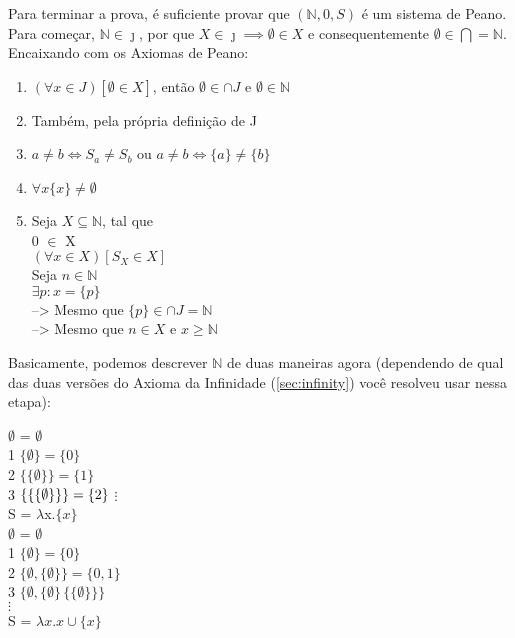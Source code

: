 \documentclass[12pt, a4paper]{article}
\begin{document}
Para terminar a prova, é suficiente provar que $(\mathbb{N}, 0, S)$ é um sistema de Peano. Para começar, $\mathbb{N} \in \jmath$, por que $X \in \jmath \implies \emptyset \in X$ e consequentemente $\emptyset \in \bigcap = \mathbb{N}$.
Encaixando com os Axiomas de Peano:
\begin{enumerate}
\item $(\forall x \in J)[\emptyset \in X]$, então $\emptyset \in \cap J$ e $\emptyset \in \mathbb{N}$
\item Também, pela própria definição de J
\item $a \neq b \iff S_a \neq S_b$ ou $a \neq b \iff \{a\} \neq \{b\}$
\item $\forall x \{x\} \neq \emptyset$
\item Seja $X \subseteq \mathbb{N}$, tal que\\
0 $\in$ X\\
$(\forall x \in X)[S_X \in X]$\\
Seja $n \in \mathbb{N}$\\
$\exists p : x = \{p\}$\\
--> Mesmo que $\{p\} \in \cap J = \mathbb{N}$\\
--> Mesmo que $n \in X$ e $x \geq \mathbb{N}$
\end{enumerate}

Basicamente, podemos descrever $\mathbb{N}$ de duas maneiras agora (dependendo de qual das duas versões do Axioma da Infinidade (\ref{sec:infinity}) você resolveu usar nessa etapa):
\begin{multicols}{2}
 \hspace{4bp} $\emptyset$ = $\emptyset$\\
1 \hspace{4bp} $\{\emptyset\} = \{0\}$\\
2 \hspace{4bp} $\{\{\emptyset\}\} = \{1\}$\\
3 \hspace{4bp} $\{\{\{\emptyset\}\}\} = \{2\}\\$
$\vdots$\\
\hspace{5bp} S = $\lambda$x.$\{x\}$ \\

 \hspace{4bp} $\emptyset$ = $\emptyset$\\
1 \hspace{4bp} $\{\emptyset\} = \{0\}$\\
2 \hspace{4bp} $\{\emptyset, \{\emptyset\}\} = \{0,1\}$\\
3 \hspace{4bp} $\{\emptyset, \{\emptyset\}\, \{\{\emptyset\}\}\}$\\
$\vdots$\\
\hspace{5bp} S = $\lambda x.x \cup \{x\} $
\end{multicols}
\end{document}
